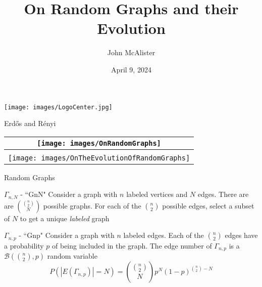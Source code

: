 \documentclass{beamer}
\title{On Random Graphs and their Evolution}
\author{John McAlister}
\institute[Fefferman Lab]{University of Tennessee - Knoxville}
\date{April 9, 2024}
\begin{document}
\begin{frame}[plain]
    \centering
    \maketitle
    \texttt{[image: images/LogoCenter.jpg]}
\end{frame}

\begin{frame}{Erd\H{o}s and R\'enyi}
	\begin{tabular}{c}
	\texttt{[image: images/OnRandomGraphs]}\\
	\hline \\
	\texttt{[image: images/OnTheEvolutionOfRandomGraphs]}
	\end{tabular}
\end{frame}

\begin{frame}{Random Graphs}
	\begin{block}{$\Gamma_{n,N}$ - ``GnN"}
		Consider a graph with $n$ labeled vertices and $N$ edges. There are are ${{n\choose 2}\choose N}$ possible graphs. For each of the ${n \choose 2}$ possible edges, select a subset of $N$ to get a unique \textit{labeled} graph
	\end{block}
	
	\begin{block}{$\Gamma_{n,p}$ - ``Gnp"}
		Consider a graph with $n$ labeled edges. Each of the ${n\choose 2}$ edges have a probability $p$ of being included in the graph. The edge number of $\Gamma_{n,p}$ is a $\mathcal{B}({n\choose 2},p)$ random variable
		$$P(|E(\Gamma_{n,p})|=N)={{n\choose 2}\choose N} p^N(1-p)^{{n\choose 2}-N}$$
	\end{block}
\end{frame}
\end{document}
